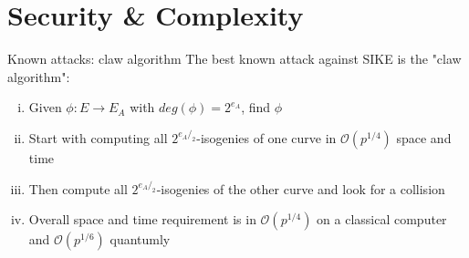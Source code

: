 \documentclass[handout]{beamer}
\begin{document}
\section{Security \& Complexity}
%

\begin{frame}{Known attacks: claw algorithm}
The best known attack against SIKE is the "claw algorithm":

\begin{enumerate}[(i)]
	\item Given $\phi : E \to E_A$ with $deg(\phi) = 2^{e_A}$, find $\phi$\pause
	\item Start with computing all $2^{e_A/_2}$-isogenies of one curve in $\mathcal{O}(p^{1/4})$ space and time\pause
	\item Then compute all $2^{e_A/_2}$-isogenies of the other curve and look for a collision\pause
	\item Overall space and time requirement is in $\mathcal{O}(p^{1/4})$ on a classical computer and $\mathcal{O}(p^{1/6})$ quantumly
\end{enumerate}
\end{frame}
\end{document}
